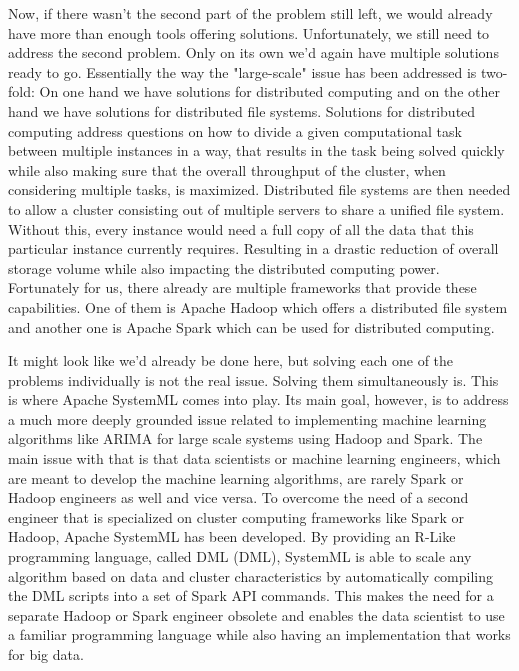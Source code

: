 Now, if there wasn't the second part of the problem still left, we would already have more than enough tools offering solutions. Unfortunately, we still need to address the second problem. Only on its own we'd again have multiple solutions ready to go. Essentially the way the "large-scale" issue has been addressed is two-fold: On one hand we have solutions for distributed computing and on the other hand we have solutions for distributed file systems. Solutions for distributed computing address questions on how to divide a given computational task between multiple instances in a way, that results in the task being solved quickly while also making sure that the overall throughput of the cluster, when considering multiple tasks, is maximized. Distributed file systems are then needed to allow a cluster consisting out of multiple servers to share a unified file system. Without this, every instance would need a full copy of all the data that this particular instance currently requires. Resulting in a drastic reduction of overall storage volume while also impacting the distributed computing power. Fortunately for us, there already are multiple frameworks that provide these capabilities. One of them is Apache Hadoop which offers a distributed file system and another one is Apache Spark which can be used for distributed computing.

It might look like we'd already be done here, but solving each one of the problems individually is not the real issue. Solving them simultaneously is. This is where Apache SystemML comes into play. Its main goal, however, is to address a much more deeply grounded issue related to implementing machine learning algorithms like \acs{ARIMA} for large scale systems using Hadoop and Spark. The main issue with that is that data scientists or machine learning engineers, which are meant to develop the machine learning algorithms, are rarely Spark or Hadoop engineers as well and vice versa. To overcome the need of a second engineer that is specialized on cluster computing frameworks like Spark or Hadoop, Apache SystemML has been developed. By providing an R-Like programming language, called \acl{DML} (\acs{DML}), SystemML is able to scale any algorithm based on data and cluster characteristics by automatically compiling the \acs{DML} scripts into a set of Spark \acs{API} commands. This makes the need for a separate Hadoop or Spark engineer obsolete and enables the data scientist to use a familiar programming language while also having an implementation that works for big data.

